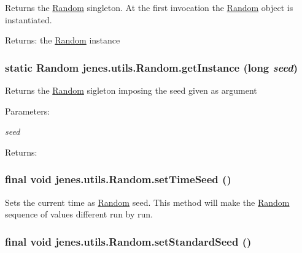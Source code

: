 Returns the \hyperlink{classjenes_1_1utils_1_1_random}{Random} singleton. At the first invocation the \hyperlink{classjenes_1_1utils_1_1_random}{Random} object is instantiated.

\begin{Desc}
\item[Returns:]the \hyperlink{classjenes_1_1utils_1_1_random}{Random} instance \end{Desc}
\hypertarget{classjenes_1_1utils_1_1_random_83dd69fffe081a48e58702c0f118b12e}{
\subsubsection[getInstance]{\setlength{\rightskip}{0pt plus 5cm}static {\bf Random} jenes.utils.Random.getInstance (long {\em seed})}}
\label{classjenes_1_1utils_1_1_random_83dd69fffe081a48e58702c0f118b12e}


Returns the \hyperlink{classjenes_1_1utils_1_1_random}{Random} sigleton imposing the seed given as argument \begin{Desc}
\item[Parameters:]
\begin{description}
\item[{\em seed}]\end{description}
\end{Desc}
\begin{Desc}
\item[Returns:]\end{Desc}
\hypertarget{classjenes_1_1utils_1_1_random_6eec3abcf133f7ce43d6a13441523a01}{
\subsubsection[setTimeSeed]{\setlength{\rightskip}{0pt plus 5cm}final void jenes.utils.Random.setTimeSeed ()}}
\label{classjenes_1_1utils_1_1_random_6eec3abcf133f7ce43d6a13441523a01}


Sets the current time as \hyperlink{classjenes_1_1utils_1_1_random}{Random} seed. This method will make the \hyperlink{classjenes_1_1utils_1_1_random}{Random} sequence of values different run by run. \hypertarget{classjenes_1_1utils_1_1_random_484017ff9c5473f7fc3fc7b52cb92433}{
\subsubsection[setStandardSeed]{\setlength{\rightskip}{0pt plus 5cm}final void jenes.utils.Random.setStandardSeed ()}}
\label{classjenes_1_1utils_1_1_random_484017ff9c5473f7fc3fc7b52cb92433}


